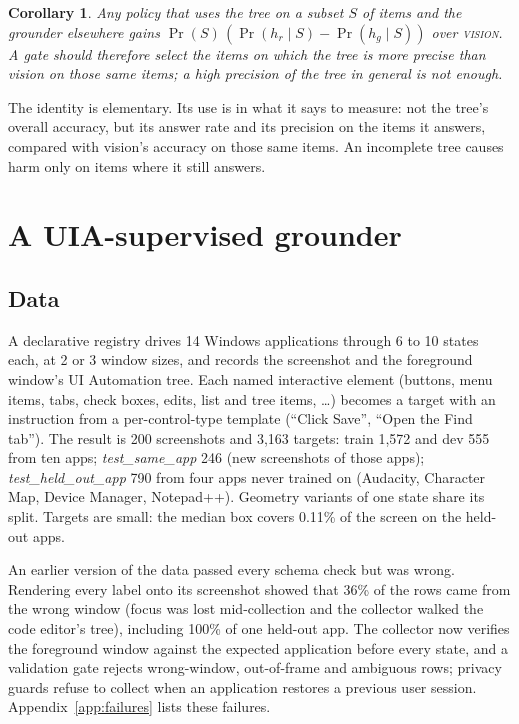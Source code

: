 \documentclass[11pt]{article}
\newtheorem{corollary}{Corollary}
\newcommand{\vis}{\textsc{vision}}
\begin{document}
\begin{corollary}
Any policy that uses the tree on a subset $S$ of items and the grounder elsewhere gains
$\Pr(S)\,(\Pr(h_r\mid S)-\Pr(h_g\mid S))$ over \vis. A gate should therefore select the items on which the
tree is \emph{more precise than vision on those same items}; a high precision of the tree in general is
not enough.
\end{corollary}

The identity is elementary. Its use is in what it says to measure: not the tree's overall accuracy, but
its answer rate and its precision on the items it answers, compared with vision's accuracy on those same
items. An incomplete tree causes harm only on items where it still answers.

\section{A UIA-supervised grounder}
\label{sec:grounder}

\subsection{Data}
A declarative registry drives 14 Windows applications through 6 to 10 states each, at 2 or 3 window sizes,
and records the screenshot and the foreground window's UI Automation tree. Each named interactive element
(buttons, menu items, tabs, check boxes, edits, list and tree items, \ldots) becomes a target with an
instruction from a per-control-type template (``Click Save'', ``Open the Find tab''). The result is
200 screenshots and 3,163 targets: train 1,572 and dev 555 from ten apps; \emph{test\_same\_app} 246 (new
screenshots of those apps); \emph{test\_held\_out\_app} 790 from four apps never trained on (Audacity,
Character Map, Device Manager, Notepad++). Geometry variants of one state share its split. Targets are
small: the median box covers 0.11\% of the screen on the held-out apps.

An earlier version of the data passed every schema check but was wrong. Rendering every label onto its
screenshot showed that 36\% of the rows came from the wrong window (focus was lost
mid-collection and the collector walked the code editor's tree), including 100\% of one held-out app. The
collector now verifies the foreground window against the expected application before every state, and a
validation gate rejects wrong-window, out-of-frame and ambiguous rows; privacy guards refuse to collect when
an application restores a previous user session. Appendix~\ref{app:failures} lists these failures.
\end{document}
